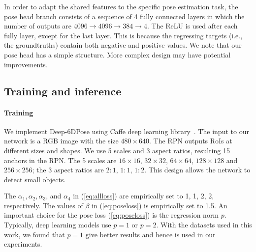 \documentclass[conference]{IEEEtran}
\newcommand{\method}[1]{Deep-6DPose}
\begin{document}
In order to adapt the shared features to the specific pose estimation task, the pose head branch consists of a sequence of 4 fully connected layers in which the number of outputs are $4096 \to 4096 \to 384 \to 4$.  The ReLU is used after each fully layer, except for the last layer. This is because the regressing targets (i.e., the groundtruths) contain both negative and positive values. We note that our pose head has a simple structure. More complex design may have potential improvements. 

\subsection{Training and inference}\paragraph{Training}
We implement \method{} using Caffe deep learning library~\cite{DBLP:conf/mm/JiaSDKLGGD14}. The input to our network is a RGB image with the size $480 \times 640$. 
The RPN outputs RoIs at different sizes and shapes. We use 5 scales and 3 aspect ratios, resulting 15 anchors in the RPN. The 5 scales are $16 \times 16$, $32\times32$, $64 \times 64$, $128\times128$ and $256 \times 256$; the 3 aspect ratios are $2:1$, $1:1$, $1:2$. This design allows the network to detect small objects. 

The $\alpha_1, \alpha_2, \alpha_3$, and $\alpha_4$ in (\ref{eq:allloss}) are empirically set to 1, 1, 2, 2, respectively. The values of $\beta$ in (\ref{eq:poseloss}) is empirically set to 1.5. 
An important choice for the pose loss (\ref{eq:poseloss}) is the regression norm $p$. Typically, deep learning models use $p=1$ or $p=2$. With the datasets used in this work, we found that $p=1$ give better results and hence is used in our experiments. 
\end{document}
